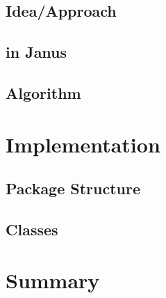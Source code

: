 \subsection{Idea/Approach}
\subsection{\LTLfToDFA in Janus}
\subsection{Algorithm}
\section{Implementation}
\subsection{Package Structure}
\subsection{Classes}
\section{Summary}